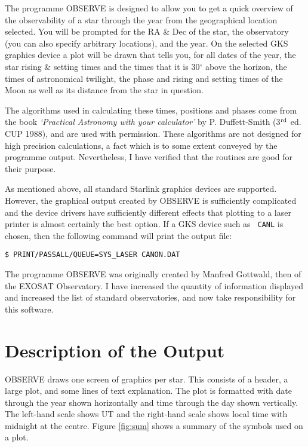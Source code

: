 The programme OBSERVE is designed to allow you to get a quick overview of the 
observability of a star through the year from the geographical location 
selected. You will be prompted for the RA \& Dec of the star, the observatory
(you can also specify arbitrary locations), and the year. On the selected GKS 
graphics device a plot will be drawn that tells you, for all dates of the year,
the star rising \& setting times and the times that it is 30$^{\circ}$ above
the  horizon, the times of astronomical twilight, the phase and rising and
setting  times of the Moon as well as its distance from the star in question.

The algorithms used in calculating these times, positions and phases come from 
the book {\em `Practical Astronomy with your calculator'}  by P. Duffett-Smith 
(3$^{\rm rd}$ ed. CUP 1988), and are used with permission. These algorithms are 
not designed for high precision calculations, a fact which is to some extent 
conveyed by the programme output. Nevertheless, I have verified that the 
routines are good for their purpose.

As mentioned above, all standard Starlink graphics devices are supported.
However, the graphical output created by OBSERVE is  sufficiently complicated
and the device drivers have sufficiently different effects that plotting to a
laser printer is almost certainly the best option. If a GKS device such as {\tt
CANL} is chosen, then the following command will print the output file:

\begin{verbatim}
$ PRINT/PASSALL/QUEUE=SYS_LASER CANON.DAT
\end{verbatim}

The programme OBSERVE was originally created by Manfred Gottwald, then of the 
EXOSAT Observatory. I have increased the quantity of information displayed 
and increased the list of standard observatories, and now take responsibility 
for this software.

\section{Description of the Output}

OBSERVE draws one screen of graphics per star. This consists of a header, a 
large plot, and some lines of text explanation. The plot is formatted with 
date through the year shown horizontally and time through the day  shown
vertically. The  left-hand scale shows UT and the right-hand scale shows local
time with midnight at the centre. Figure \ref{fig:sum} shows a summary of the
symbols used on a plot.


